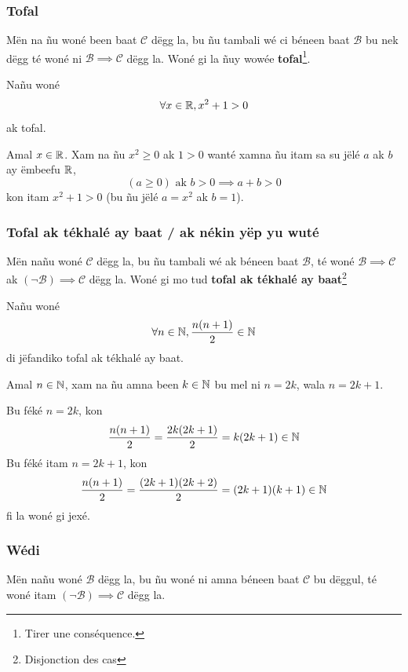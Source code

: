\documentclass[twoside, a4paper]{article}
\begin{document}
\subsubsection{Tofal}

\begin{tcolorbox}[enhanced jigsaw,breakable,pad at break*=1mm, colback=red!5!white,colframe=white!75!black,title= Téeki,
    watermark color=white]
  Mën na ñu woné been baat $\mathcal{C}$ dëgg la, bu ñu tambali wé ci béneen baat $\mathcal{B}$ bu nek dëgg té woné ni $\mathcal{B} \implies \mathcal{C}$ dëgg la. Woné gi la ñuy wowée \textbf{tofal}\footnote{Tirer une conséquence.}.


\end{tcolorbox}




Nañu woné $$ \forall x \in \mathbb{R}, x^2 + 1 > 0$$ ak tofal.

Amal $x\in \mathbb{R}$. Xam na ñu $x^2 \geq 0$ ak $1 > 0$ wanté xamna ñu itam sa su jëlé $a$ ak $b$ ay ëmbeefu $\mathbb{R}$, $$(a \geq 0)\text{ ak }b > 0 \implies a+b >0$$ kon itam $x^2+1>0$ (bu ñu jëlé $a=x^2$ ak $b=1$).


\subsubsection{Tofal ak tékhalé ay baat / ak nékin yëp yu wuté}
\begin{tcolorbox}[enhanced jigsaw,breakable,pad at break*=1mm, colback=red!5!white,colframe=white!75!black,title= Téeki,watermark color=white]
  Mën nañu woné $\mathcal{C}$ dëgg la, bu ñu tambali wé ak béneen baat $\mathcal{B}$, té woné  $\mathcal{B} \implies \mathcal{C}$ ak $(\neg\mathcal{B})\implies \mathcal{C}$ dëgg la. Woné gi mo tud \textbf{tofal ak tékhalé ay baat}\footnote{Disjonction des cas}
\end{tcolorbox}
Nañu woné $$ \forall n \in \mathbb{N}, \frac{n(n + 1)}{2} \in \mathbb{N}$$
di jëfandiko tofal ak tékhalé ay baat.

Amal $n \in \mathbb{N}$, xam na ñu amna been $k \in \mathbb{N}$ bu mel ni $n = 2 k$, wala $n = 2k+1$.

Bu féké $n = 2 k$, kon $$\frac{n(n + 1)}{2} = \frac{2k(2k+1)}{2} = k(2k+1) \in \mathbb{N}$$
Bu féké itam $n = 2k+1$, kon $$\frac{n(n + 1)}{2} = \frac{(2k+1)(2k+2)}{2} = (2k+1)(k+1) \in \mathbb{N}$$
fi la woné gi jexé.

\subsubsection{Wédi}
\begin{tcolorbox}[enhanced jigsaw,breakable,pad at break*=1mm, colback=red!5!white,colframe=white!75!black,title= Téeki,watermark color=white]
  Mën nañu woné $\mathcal{B}$ dëgg la, bu ñu woné ni amna béneen baat $\mathcal{C}$ bu dëggul, té woné itam $(\neg \mathcal{B}) \implies \mathcal{C}$ dëgg la.
\end{tcolorbox}
\end{document}
